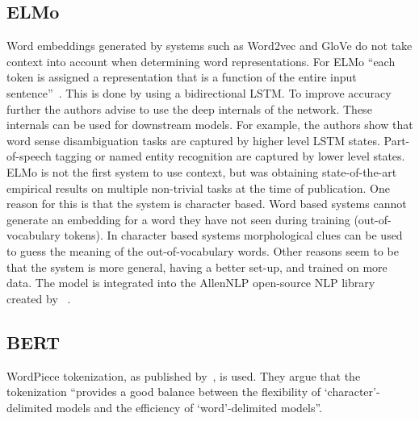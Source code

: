 \subsection{ELMo}
\label{subsec:elmo}
Word embeddings generated by systems such as Word2vec and GloVe do not take context into account when determining word representations.
For ELMo ``each token is assigned a representation that is a function of the entire input sentence''~\citep{peters2018}.
This is done by using a bidirectional LSTM.
To improve accuracy further the authors advise to use the deep internals of the network.
These internals can be used for downstream models.
For example, the authors show that word sense disambiguation tasks are captured by higher level LSTM states.
Part-of-speech tagging or named entity recognition are captured by lower level states.
ELMo is not the first system to use context, but was obtaining state-of-the-art empirical results on multiple non-trivial tasks at the time of publication.
One reason for this is that the system is character based.
Word based systems cannot generate an embedding for a word they have not seen during training (out-of-vocabulary tokens).
In character based systems morphological clues can be used to guess the meaning of the out-of-vocabulary words.
Other reasons seem to be that the system is more general, having a better set-up, and trained on more data.
The model is integrated into the AllenNLP open-source NLP library created by ~\citet{gardner2017}.

\subsection{BERT}
\label{subsec:bert}
WordPiece tokenization, as published by~\citet{wu2016}, is used.
They argue that the tokenization ``provides a good balance between the flexibility of `character'-delimited models and the efficiency of `word'-delimited models''.